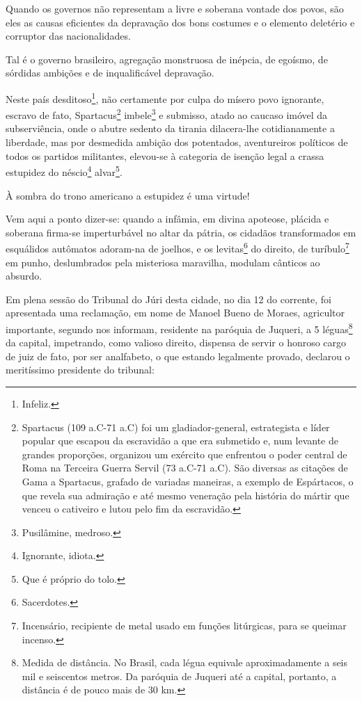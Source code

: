 \asterisc{}

Quando os governos não representam a livre e soberana vontade dos povos,
são eles as causas eficientes da depravação dos bons costumes e o
elemento deletério e corruptor das nacionalidades.

Tal é o governo brasileiro, agregação monstruosa de inépcia, de egoísmo,
de sórdidas ambições e de inqualificável depravação.

Neste país desditoso\footnote{Infeliz.}, não certamente por culpa do
mísero povo ignorante, escravo de fato, Spartacus\footnote{Spartacus
  (109 a.C-71 a.C) foi um gladiador-general, estrategista e líder
  popular que escapou da escravidão a que era submetido e, num levante
  de grandes proporções, organizou um exército que enfrentou o poder
  central de Roma na Terceira Guerra Servil (73 a.C-71 a.C). São
  diversas as citações de Gama a Spartacus, grafado de variadas
  maneiras, a exemplo de Espártacos, o que revela sua admiração e até
  mesmo veneração pela história do mártir que venceu o cativeiro e lutou
  pelo fim da escravidão.} imbele\footnote{Pusilâmine, medroso.} e
submisso, atado ao caucaso imóvel da subserviência, onde o abutre
sedento da tirania dilacera-lhe cotidianamente a liberdade, mas por
desmedida ambição dos potentados, aventureiros políticos de todos os
partidos militantes, elevou-se à categoria de isenção legal a crassa
estupidez do néscio\footnote{Ignorante, idiota.} alvar\footnote{Que
  é próprio do tolo.}.

À sombra do trono americano a estupidez é uma virtude!

Vem aqui a ponto dizer-se: quando a infâmia, em divina apoteose, plácida
e soberana firma-se imperturbável no altar da pátria, os cidadãos
transformados em esquálidos autômatos adoram-na de joelhos, e os
levitas\footnote{Sacerdotes.} do direito, de turíbulo\footnote{
  Incensário, recipiente de metal usado em funções litúrgicas, para se
  queimar incenso.} em punho, deslumbrados pela misteriosa maravilha,
modulam cânticos ao absurdo.

Em plena sessão do Tribunal do Júri desta cidade, no dia 12 do corrente,
foi apresentada uma reclamação, em nome de Manoel Bueno de Moraes,
agricultor importante, segundo nos informam, residente na paróquia de
Juqueri, a 5 léguas\footnote{Medida de distância. No Brasil, cada
  légua equivale aproximadamente a seis mil e seiscentos metros. Da
  paróquia de Juqueri até a capital, portanto, a distância é de pouco
  mais de 30 km.} da capital, impetrando, como valioso direito, dispensa
de servir o honroso cargo de juiz de fato, por ser analfabeto, o que
estando legalmente provado, declarou o meritíssimo presidente do
tribunal:


